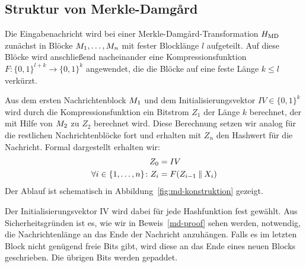 \subsection{Struktur von Merkle-Damgård}
Die Eingabenachricht wird bei einer Merkle-Damgård-Transformation $H_{\textnormal{MD}}$ zunächst in Blöcke $M_{1},\dots, M_{n}$ mit fester Blocklänge $l$ aufgeteilt.
Auf diese Blöcke wird anschließend nacheinander eine Kompressionsfunktion $F \colon \{0, 1\}^{l + k} \rightarrow \{0,1\}^{k}$ angewendet, die %
die Blöcke auf eine feste Länge $k \leq l$ verkürzt.

Aus dem ersten Nachrichtenblock $M_{1}$ und dem Initialisierungsvektor $IV \in \{0, 1\}^k$  wird durch die Kompressionsfunktion ein Bitstrom $Z_1$ der Länge $k$
berechnet, der mit Hilfe von $M_2$ zu $Z_2$ berechnet wird. Diese Berechnung setzen wir analog für die restlichen Nachrichtenblöcke fort und erhalten mit $Z_{n}$ den Hashwert für die Nachricht. Formal dargestellt erhalten wir:
\begin{align*}
	Z_0 &= IV\\
	\forall i \in \{1,\dots, n\}\colon Z_{i} &= F(Z_{i-1} \mathbin{\|} X_{i})
\end{align*}
Der Ablauf ist schematisch in Abbildung~\ref{fig:md-konstruktion} gezeigt.

Der Initialisierungsvektor IV wird dabei für jede Hashfunktion fest gewählt. Aus Sicherheitsgründen ist es, wie wir in Beweis~\ref{md-proof} sehen werden, notwendig, die Nachrichtenlänge an das Ende der Nachricht anzuhängen. Falls es im letzten Block nicht genügend freie Bits gibt, wird diese an das Ende eines neuen Blocks geschrieben. Die übrigen Bits werden gepaddet.

